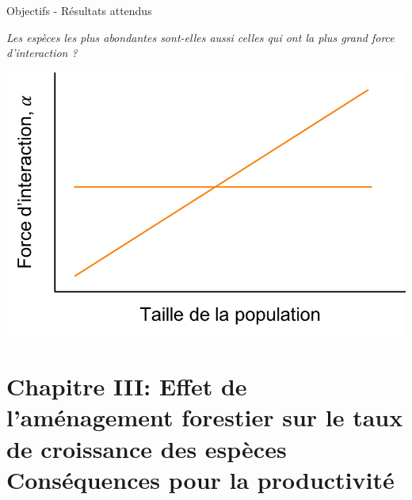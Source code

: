 \documentclass[11pt, compress, aspectratio=1610]{beamer}
\begin{document}
\begin{frame}{Objectifs - Résultats attendus}
\protect\hypertarget{objectifs---ruxe9sultats-attendus-2}{}

\centering

\emph{Les espèces les plus abondantes sont-elles aussi celles qui ont la
plus grand force d’interaction ?}

\vspace*{10mm}
\centering

\includegraphics[scale=0.5]{figures/output_chap2c.png}

\par

\end{frame}

\hypertarget{chapitre-iii-effet-de-lamuxe9nagement-forestier-sur-le-taux-de-croissance-des-espuxe8ces-consuxe9quences-pour-la-productivituxe9}{%
\section{\texorpdfstring{Chapitre III: \newline Effet de l’aménagement
forestier sur le taux de croissance des espèces
\newline \large Conséquences pour la
productivité}{Chapitre III: Effet de l’aménagement forestier sur le taux de croissance des espèces Conséquences pour la productivité}}\label{chapitre-iii-effet-de-lamuxe9nagement-forestier-sur-le-taux-de-croissance-des-espuxe8ces-consuxe9quences-pour-la-productivituxe9}}
\end{document}
